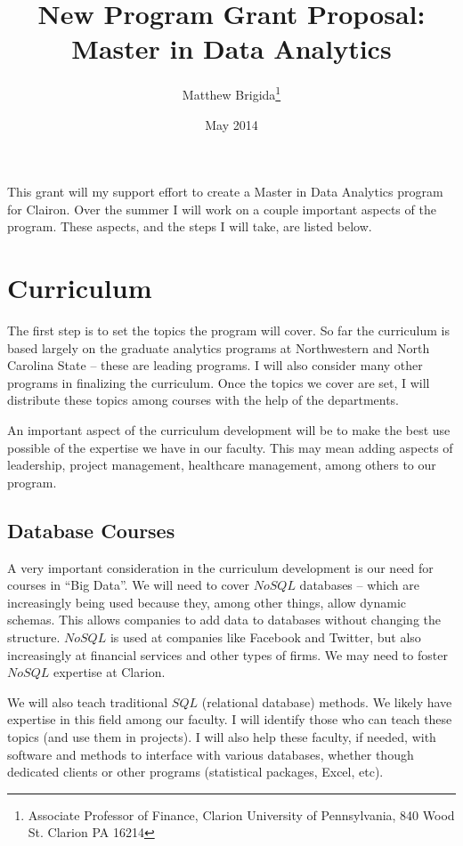 \documentclass[12pt]{article}
\title{New Program Grant Proposal:  \\
Master in Data Analytics}
\author{Matthew Brigida\footnote{Associate Professor of Finance, Clarion University of Pennsylvania, 840 Wood St. Clarion PA 16214}}
\date{May 2014}
\begin{document}
\maketitle
\clearpage
This grant will my support effort to create a Master in Data Analytics program for Clairon.  Over the summer I will work on a couple important aspects of the program.  These aspects, and the steps I will take, are listed below.

\section{Curriculum}

The first step is to set the topics the program will cover.  So far the curriculum is based largely on the graduate analytics programs at Northwestern and North Carolina State -- these are leading programs.  I will also consider many other programs in finalizing the curriculum.  Once the topics we cover are set, I will distribute these topics among courses with the help of the departments.

An important aspect of the curriculum development will be to make the best use possible of the expertise we have in our faculty.  This may mean adding aspects of leadership, project management, healthcare management, among others to our program. 

\subsection{Database Courses}  

A very important consideration in the curriculum development is our need for courses in ``Big Data''. We will need to cover $NoSQL$ databases -- which are increasingly being used because they, among other things, allow dynamic schemas. This allows companies to add data to databases without changing the structure.  $NoSQL$ is used at companies like Facebook and Twitter, but also increasingly at financial services and other types of firms.  We may need to foster $NoSQL$ expertise at Clarion.

We will also teach traditional $SQL$ (relational database) methods.  We likely have expertise in this field among our faculty.  I will identify those who can teach these topics (and use them in projects).  I will also help these faculty, if needed, with software and methods to interface with various databases, whether though dedicated clients or other programs (statistical packages, Excel, etc).
\end{document}
